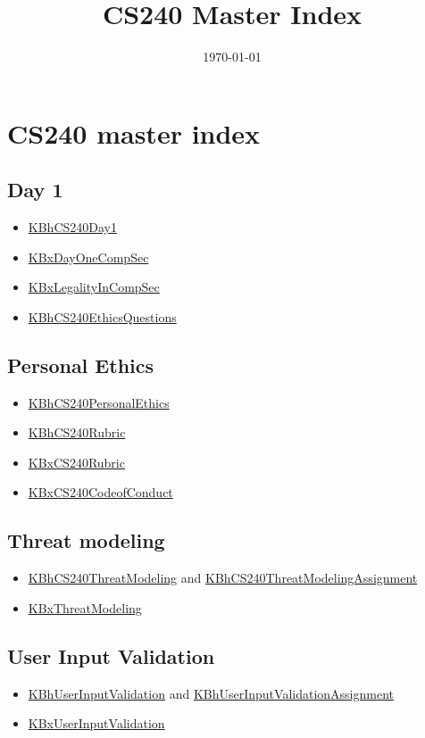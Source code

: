 \documentclass[letterpaper]{article}
\date{\today}
\title{CS240 Master Index}
\renewcommand\maketitle{}
\begin{document}
\maketitle


\section{CS240 master index}
\label{sec:org90608ea}
\subsection{Day 1}
\label{sec:org81d5c75}
\begin{itemize}
\item \href{KBhCS240Day1.org}{KBhCS240Day1}
\item \href{KBxDayOneCompSec.org}{KBxDayOneCompSec}
\item \href{KBxLegalityInCompSec.org}{KBxLegalityInCompSec}
\item \href{KBhCS240EthicsQuestions.org}{KBhCS240EthicsQuestions}
\end{itemize}

\subsection{Personal Ethics}
\label{sec:orgfea301b}
\begin{itemize}
\item \href{KBhCS240PersonalEthics.org}{KBhCS240PersonalEthics}
\item \href{KBhCS240Rubric.org}{KBhCS240Rubric}
\item \href{KBxCS240Rubric.org}{KBxCS240Rubric}
\item \href{KBxCS240CodeofConduct.org}{KBxCS240CodeofConduct}
\end{itemize}

\subsection{Threat modeling}
\label{sec:org8cb0009}
\begin{itemize}
\item \href{KBhCS240ThreatModeling.org}{KBhCS240ThreatModeling} and
\href{KBhCS240ThreatModelingAssignment.org}{KBhCS240ThreatModelingAssignment}
\item \href{KBxThreatModeling.org}{KBxThreatModeling}
\end{itemize}

\subsection{User Input Validation}
\label{sec:org30cc15d}
\begin{itemize}
\item \href{KBhUserInputValidation.org}{KBhUserInputValidation} and
\href{KBhUserInputValidationAssignment.org}{KBhUserInputValidationAssignment}
\item \href{KBxUserInputValidation.org}{KBxUserInputValidation}
\end{itemize}
\end{document}
